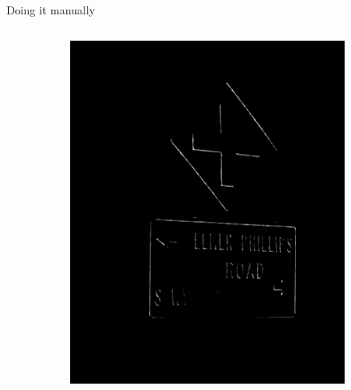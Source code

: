\documentclass{beamer}
\begin{document}
\begin{frame}{Doing it manually}
\begin{columns}
\begin{column}{0.85\textwidth}
\begin{figure}
\begin{subfigure}[b]{0.22\textwidth}
          \includegraphics[width=\textwidth]{figures/manual_filters/edge_res_5.png}
      \end{subfigure}
      \begin{subfigure}[b]{0.22\textwidth}

\end{subfigure}
\end{figure}
\end{column}
\end{columns}
\end{frame}
\end{document}
